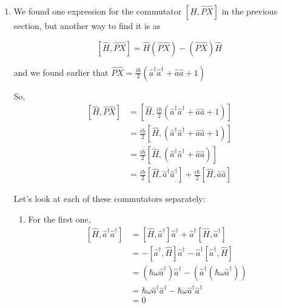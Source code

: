 \documentclass[twoside]{article}
\begin{document}
\begin{enumerate}
   \item We found one expression for the commutator $\left[ \hat{H}, \hat{P}\hat{X} \right]$ in the previous section, but another way to find it is as 
   
   \[ \left[ \hat{H}, \hat{P}\hat{X} \right] = \hat{H} \left( \hat{P}\hat{X}\right) - \left( \hat{P}\hat{X}\right) \hat{H} \]

   and we found earlier that $\hat{P}\hat{X} = \frac{i\hbar}{2} \left( \hat{a}^{\dagger}\hat{a}^{\dagger}  + \hat{a}\hat{a} + 1 \right)$

   So, 
   \begin{align*}
      \left[ \hat{H}, \hat{P}\hat{X} \right] &= \left[ \hat{H}, \frac{i\hbar}{2} \left( \hat{a}^{\dagger}\hat{a}^{\dagger}  + \hat{a}\hat{a} + 1 \right) \right] \\
      &= \frac{i\hbar}{2}  \left[ \hat{H}, \left( \hat{a}^{\dagger}\hat{a}^{\dagger}  + \hat{a}\hat{a} + 1 \right) \right]  \\
      &= \frac{i\hbar}{2}  \left[ \hat{H}, \left( \hat{a}^{\dagger}\hat{a}^{\dagger}  + \hat{a}\hat{a} \right) \right] \\
      &= \frac{i\hbar}{2}  \left[ \hat{H}, \hat{a}^{\dagger}\hat{a}^{\dagger} \right] + \frac{i\hbar}{2}  \left[ \hat{H}, \hat{a}\hat{a} \right] 
   \end{align*}

   Let's look at each of these commutators separately:

   \begin{enumerate}
      \item For the first one, 
      \begin{align*}
         \left[ \hat{H}, \hat{a}^{\dagger}\hat{a}^{\dagger} \right] &= \left[ \hat{H}, \hat{a}^{\dagger} \right]\hat{a}^{\dagger} + \hat{a}^{\dagger}\left[ \hat{H}, \hat{a}^{\dagger}\right] \\
         &= -\left[\hat{a}^{\dagger}, \hat{H}  \right]\hat{a}^{\dagger} - \hat{a}^{\dagger}\left[ \hat{a}^{\dagger}, \hat{H} \right] \\
         &= (\hbar\omega \hat{a}^{\dagger}) \hat{a}^{\dagger} - \left(\hat{a}^{\dagger}(\hbar\omega \hat{a}^{\dagger}) \right) \\
         &= \hbar\omega \hat{a}^{\dagger}\hat{a}^{\dagger} - \hbar\omega \hat{a}^{\dagger}\hat{a}^{\dagger} \\
         &= 0
      \end{align*}


\end{enumerate}
\end{enumerate}
\end{document}
